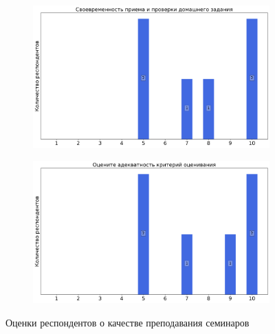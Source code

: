 \begin{figure}[H]
\begin{subfigure}[b]{0.45\textwidth}
                \includegraphics[width=\textwidth]{images/2 course/Аналитическая механика/seminarists-marks-Сидоренко В.В.-2.png}
            \end{subfigure}
            \begin{subfigure}[b]{0.45\textwidth}
                \centering
                \includegraphics[width=\textwidth]{images/2 course/Аналитическая механика/seminarists-marks-Сидоренко В.В.-3.png}
            \end{subfigure}	
            \caption{Оценки респондентов о качестве преподавания семинаров}
        \end{figure}


